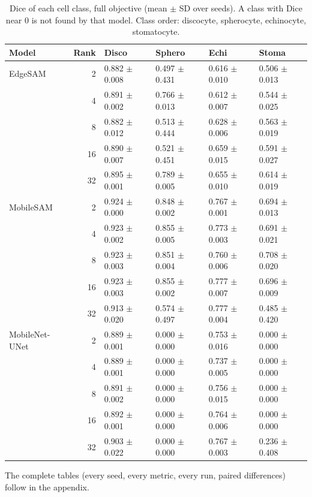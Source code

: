 \documentclass[10pt]{article}
\begin{document}
\begin{table}[H]\centering\footnotesize
\begin{tabular}{l r l l l l}
\toprule
Model & Rank & Disco & Sphero & Echi & Stoma \\
\midrule
EdgeSAM & 2 & 0.882 $\pm$ 0.008 & 0.497 $\pm$ 0.431 & 0.616 $\pm$ 0.010 & 0.506 $\pm$ 0.013 \\
 & 4 & 0.891 $\pm$ 0.002 & 0.766 $\pm$ 0.013 & 0.612 $\pm$ 0.007 & 0.544 $\pm$ 0.025 \\
 & 8 & 0.882 $\pm$ 0.012 & 0.513 $\pm$ 0.444 & 0.628 $\pm$ 0.006 & 0.563 $\pm$ 0.019 \\
 & 16 & 0.890 $\pm$ 0.007 & 0.521 $\pm$ 0.451 & 0.659 $\pm$ 0.015 & 0.591 $\pm$ 0.027 \\
 & 32 & 0.895 $\pm$ 0.001 & 0.789 $\pm$ 0.005 & 0.655 $\pm$ 0.010 & 0.614 $\pm$ 0.019 \\
\midrule
MobileSAM & 2 & 0.924 $\pm$ 0.000 & 0.848 $\pm$ 0.002 & 0.767 $\pm$ 0.001 & 0.694 $\pm$ 0.013 \\
 & 4 & 0.923 $\pm$ 0.002 & 0.855 $\pm$ 0.005 & 0.773 $\pm$ 0.003 & 0.691 $\pm$ 0.021 \\
 & 8 & 0.923 $\pm$ 0.003 & 0.851 $\pm$ 0.004 & 0.760 $\pm$ 0.006 & 0.708 $\pm$ 0.020 \\
 & 16 & 0.923 $\pm$ 0.003 & 0.855 $\pm$ 0.002 & 0.777 $\pm$ 0.007 & 0.696 $\pm$ 0.009 \\
 & 32 & 0.913 $\pm$ 0.020 & 0.574 $\pm$ 0.497 & 0.777 $\pm$ 0.004 & 0.485 $\pm$ 0.420 \\
\midrule
MobileNet-UNet & 2 & 0.889 $\pm$ 0.001 & 0.000 $\pm$ 0.000 & 0.753 $\pm$ 0.016 & 0.000 $\pm$ 0.000 \\
 & 4 & 0.889 $\pm$ 0.001 & 0.000 $\pm$ 0.000 & 0.737 $\pm$ 0.005 & 0.000 $\pm$ 0.000 \\
 & 8 & 0.891 $\pm$ 0.002 & 0.000 $\pm$ 0.000 & 0.756 $\pm$ 0.015 & 0.000 $\pm$ 0.000 \\
 & 16 & 0.892 $\pm$ 0.001 & 0.000 $\pm$ 0.000 & 0.764 $\pm$ 0.006 & 0.000 $\pm$ 0.000 \\
 & 32 & 0.903 $\pm$ 0.022 & 0.000 $\pm$ 0.000 & 0.767 $\pm$ 0.003 & 0.236 $\pm$ 0.408 \\
\bottomrule
\end{tabular}
\caption{Dice of each cell class, full objective (mean $\pm$ SD over seeds). A class with Dice near 0 is not found by that model. Class order: discocyte, spherocyte, echinocyte, stomatocyte.}\label{tab:classes}
\end{table}

The complete tables (every seed, every metric, every run, paired differences) follow in the appendix.
\end{document}
